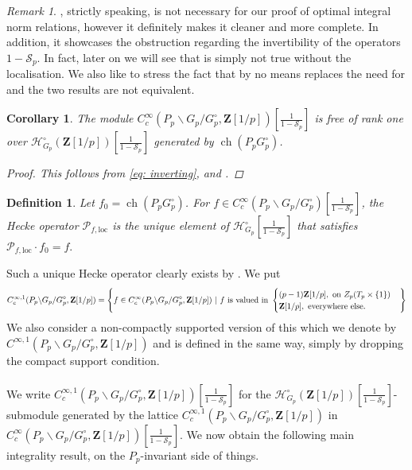 \documentclass{amsart}%
\theoremstyle{plain}
\newtheorem{cor}[thm]{Corollary}
\newcommand\scalemath[2]{\scalebox{#1}{\mbox{\ensuremath{\displaystyle #2}}}}
\theoremstyle{plain}
\newtheorem{defn}[thm]{Definition}
\theoremstyle{remark}
\newtheorem{rem}[thm]{Remark}
\DeclareMathOperator{\ch}{ch}
\begin{document}
\begin{rem}
    , strictly speaking, is not necessary for our proof of optimal integral norm relations, however it definitely makes it cleaner and more complete. In addition, it showcases the obstruction regarding the invertibility of the operators $1-\mathcal{S}_p$. In fact, later on we will see that  is simply not true without the localisation. We also like to stress the fact that  by no means replaces the need for  and the two results are not equivalent. 
\end{rem}
\begin{cor}\label{cor freeness at integral level for P-invariants}
    The module $C_c^\infty(P_p\backslash G_p/G_p^\circ,\mathbf{Z}[1/p])[\frac{1}{1-\mathcal{S}_p}]$ is free of rank one over $\mathcal{H}_{G_p}^\circ(\mathbf{Z}[1/p])[\frac{1}{1-\mathcal{S}_p}]$ generated by $\ch(P_pG_p^\circ)$.
    \begin{proof}
        This follows from \eqref{eq: inverting},  and .
    \end{proof}
\end{cor}
\begin{defn}
    Let $f_0=\ch(P_pG_p^\circ)$. For $f\in C_c^\infty(P_p\backslash G_p/G_p^\circ)[\frac{1}{1-\mathcal{S}_p}]$, the Hecke operator $\mathcal{P}_{f,\mathrm{loc}}$ is the unique element of $\mathcal{H}_{G_p}^\circ[\frac{1}{1-\mathcal{S}_p}]$ that satisfies $\mathcal{P}_{f,\mathrm{loc}}\cdot f_0=f.$
\end{defn}
\noindent Such a unique Hecke operator clearly exists by . We put 
\begin{align}\label{eq:111}
\scalemath{0.95}{C_c^{\infty,1}(P_p\backslash G_p/G_p^\circ,\mathbf{Z}[1/p])=\left\{f\in C_c^\infty(P_p\backslash G_p/G_p^\circ,\mathbf{Z}[1/p])\ |\ f\ \text{is valued in}\ \begin{cases}
    (p-1)\mathbf{Z}[1/p],\ \text{on}\ Z_p(T_p\times \{1\}) \\
    \mathbf{Z}[1/p],\ \text{everywhere else.}
\end{cases}\right\}}\end{align}
\noindent We also consider a non-compactly supported version of this which we denote by $C^{\infty,1}(P_p\backslash G_p/G_p^\circ,\mathbf{Z}[1/p])$ and is defined in the same way, simply by dropping the compact support condition.\\
\\
We write $C_c^{\infty,1}(P_p\backslash G_p/G_p^\circ,\mathbf{Z}[1/p])[\frac{1}{1-\mathcal{S}_p}]$ for the $\mathcal{H}_{G_p}^\circ(\mathbf{Z}[1/p])[\frac{1}{1-\mathcal{S}_p}]$-submodule generated by the lattice $C_c^{\infty,1}(P_p\backslash G_p/G_p^\circ,\mathbf{Z}[1/p])$ in $C_c^\infty(P_p\backslash G_p/G_p^\circ,\mathbf{Z}[1/p])[\frac{1}{1-\mathcal{S}_p}]$. We now obtain the following main integrality result, on the $P_p$-invariant side of things.
\end{document}
